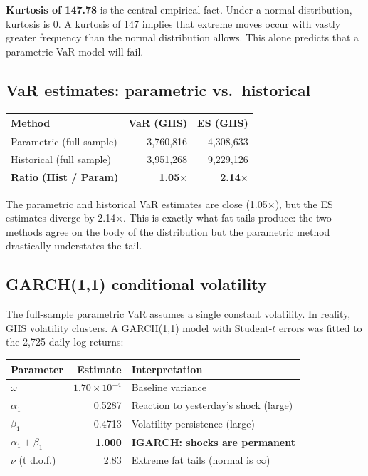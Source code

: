 \documentclass[11pt,a4paper]{article}
\begin{document}
\noindent\textbf{Kurtosis of 147.78} is the central empirical fact. Under
a normal distribution, kurtosis is 0. A kurtosis of 147 implies that
extreme moves occur with vastly greater frequency than the normal
distribution allows. This alone predicts that a parametric VaR model
will fail.

\subsection{VaR estimates: parametric vs.\ historical}

\begin{table}[h!]
\centering
\renewcommand{\arraystretch}{1.3}
\begin{tabular}{L{4cm} r r}
\toprule
\textbf{Method} & \textbf{VaR (GHS)} & \textbf{ES (GHS)} \\
\midrule
Parametric (full sample)  & 3{,}760{,}816 & 4{,}308{,}633 \\
Historical (full sample)  & 3{,}951{,}268 & 9{,}229{,}126 \\
\midrule
\textbf{Ratio (Hist / Param)} & \textbf{1.05\(\times\)} & \textbf{2.14\(\times\)} \\
\bottomrule
\end{tabular}
\end{table}

\noindent The parametric and historical VaR estimates are close
(1.05\(\times\)), but the ES estimates diverge by 2.14\(\times\). This
is exactly what fat tails produce: the two methods agree on the body of
the distribution but the parametric method drastically understates the
tail.

\subsection{GARCH(1,1) conditional volatility}

The full-sample parametric VaR assumes a single constant volatility.
In reality, GHS volatility clusters. A GARCH(1,1) model with Student-\(t\)
errors was fitted to the 2{,}725 daily log returns:

\begin{table}[h!]
\centering
\renewcommand{\arraystretch}{1.3}
\begin{tabular}{L{4cm} r L{7cm}}
\toprule
\textbf{Parameter} & \textbf{Estimate} & \textbf{Interpretation} \\
\midrule
$\omega$     & $1.70 \times 10^{-4}$ & Baseline variance \\
$\alpha_1$   & 0.5287 & Reaction to yesterday's shock (large) \\
$\beta_1$    & 0.4713 & Volatility persistence (large) \\
$\alpha_1 + \beta_1$ & \textbf{1.000} & \textbf{IGARCH: shocks are permanent} \\
$\nu$ (t d.o.f.) & 2.83 & Extreme fat tails (normal is $\infty$) \\
\bottomrule
\end{tabular}
\end{table}
\end{document}
